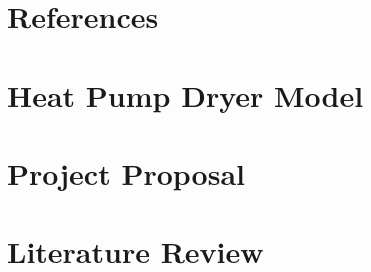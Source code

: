 \documentclass[12pt]{report}
\begin{document}
\chapter*{References}



\begin{appendices}

\chapter{Heat Pump Dryer Model} \label{app:heatpumpmodel}


\chapter{Project Proposal} \label{sec:proposal}




\chapter{Literature Review} \label{sec:litreview}


\end{appendices}
\end{document}
